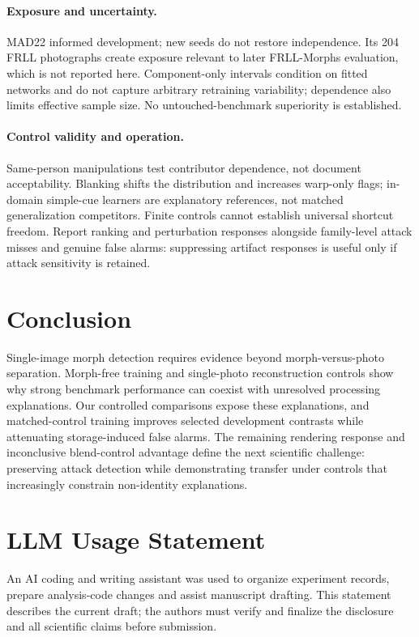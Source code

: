 \documentclass[10pt,twocolumn,letterpaper]{article}
\begin{document}
\paragraph{Exposure and uncertainty.}
MAD22 informed development; new seeds do not restore independence. Its 204 FRLL photographs create exposure relevant to later FRLL-Morphs evaluation, which is not reported here. Component-only intervals condition on fitted networks and do not capture arbitrary retraining variability; dependence also limits effective sample size. No untouched-benchmark superiority is established.

\paragraph{Control validity and operation.}
Same-person manipulations test contributor dependence, not document acceptability. Blanking shifts the distribution and increases warp-only flags; in-domain simple-cue learners are explanatory references, not matched generalization competitors. Finite controls cannot establish universal shortcut freedom. Report ranking and perturbation responses alongside family-level attack misses and genuine false alarms: suppressing artifact responses is useful only if attack sensitivity is retained.

\section{Conclusion}
Single-image morph detection requires evidence beyond morph-versus-photo separation. Morph-free training and single-photo reconstruction controls show why strong benchmark performance can coexist with unresolved processing explanations. Our controlled comparisons expose these explanations, and matched-control training improves selected development contrasts while attenuating storage-induced false alarms. The remaining rendering response and inconclusive blend-control advantage define the next scientific challenge: preserving attack detection while demonstrating transfer under controls that increasingly constrain non-identity explanations.

\section*{LLM Usage Statement}
An AI coding and writing assistant was used to organize experiment records, prepare analysis-code changes and assist manuscript drafting. This statement describes the current draft; the authors must verify and finalize the disclosure and all scientific claims before submission.

{\small}
\end{document}
